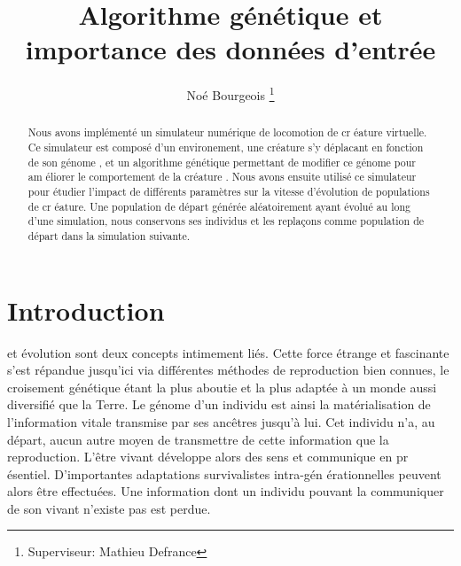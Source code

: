 \documentclass[journal, a4paper]{IEEEtran}
\begin{document}
	\title{Algorithme génétique et importance des données d'entrée}
	\author{Noé Bourgeois
	\thanks{Superviseur: Mathieu Defrance}}
	\maketitle

\begin{abstract}
	Nous avons implémenté un simulateur numérique de locomotion de cr
	éature virtuelle. Ce simulateur est
	composé d'un environement, une créature s'y déplacant en fonction
	de son génome
	, et
	un
	algorithme génétique permettant de modifier ce génome pour am
	éliorer le comportement de la créature
	.
	Nous avons ensuite utilisé ce simulateur pour étudier l'impact de
	différents paramètres sur la vitesse d'évolution de populations
	de cr
	éature.
	Une population de départ générée aléatoirement ayant évolué au long
	d'une
	simulation, nous conservons ses individus et les replaçons comme population de départ
	dans la simulation suivante.
\end{abstract}

\section{Introduction}
	 et évolution sont deux concepts intimement liés.
	Cette force étrange et fascinante s'est répandue jusqu'ici via
	différentes méthodes de reproduction bien connues, le croisement
	génétique étant la plus aboutie et la plus adaptée à un monde aussi
	diversifié que la Terre.
	Le génome d'un individu est ainsi la matérialisation de
	l'information vitale transmise par ses ancêtres jusqu'à lui.
	Cet individu n'a, au départ, aucun autre moyen de transmettre de
	cette information que la reproduction.
	L'être vivant développe alors des sens et communique en pr
	ésentiel. D'importantes adaptations survivalistes intra-gén
	érationnelles  peuvent alors être effectuées. Une information
	dont un individu pouvant la communiquer de son vivant n'existe
	pas est perdue.
\end{document}
